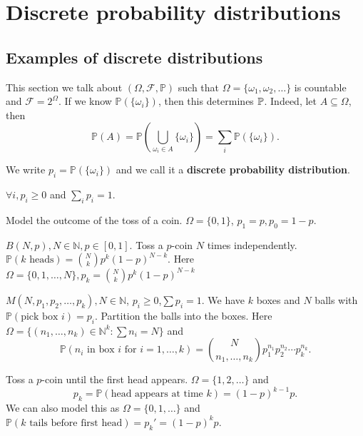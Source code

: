\section{Discrete probability distributions}
\subsection{Examples of discrete distributions}
This section we talk about $ (\Omega,\mathscr{F},\mathbb{P}) $ such that $ \Omega=\{\omega_1,\omega_2,\dots\} $ is countable and $ \mathscr{F} = 2^{\Omega} $. If we know $ \mathbb{P}(\{\omega_i\}) $, then this determines ${\mathbb{P}}$. Indeed, let $ A \subseteq \Omega $, then
\[
    \mathbb{P}(A) = \mathbb{P}\left( \bigcup_{\omega_i\in A}\{\omega_i\} \right) = \sum_{i} \mathbb{P}(\{\omega_i\}).
\]
\begin{definition}
    We write $ p_i = \mathbb{P}(\{\omega_i\}) $ and we call it a \textbf{discrete probability distribution}.
\end{definition}
\begin{proposition}
    $ \forall i,p_i\ge 0 $ and $ \sum_i p_i=1 $.
\end{proposition}

\begin{example}
    Model the outcome of the toss of a coin. $ \Omega = \{0,1\} $, $ p_1=p,p_0=1-p $.
\end{example}

\begin{example}
    $ B(N,p),N\in \mathbb{N}, p\in [0,1] $. Toss a $p$-coin $N$ times independently. $ \mathbb{P}(k\text{ heads}) = \binom{N}{k}p^k(1-p)^{N-k} $. Here $ \Omega=\{0,1,\dots,N\},p_k=\binom{N}{k}p^k(1-p)^{N-k} $
\end{example}

\begin{example}
    $ M(N,p_1,p_2,\dots,p_k), N\in \mathbb{N}$, $p_i\ge 0$,$\sum p_i=1 $. We have $k$ boxes and $N$ balls with $ \mathbb{P}(\text{pick box }i)=p_i $. Partition the balls into the boxes. Here $ \Omega = \{(n_1,\dots,n_k)\in \mathbb{N}^k: \sum n_i=N\} $ and 
    \[
        \mathbb{P}(n_i \text{ in box }i \text{ for } i=1,\dots,k) = \binom{N}{n_1,\dots,n_k}p_1^{n_1}p_2^{n_2}\cdots p_k^{n_k}.
    \]
\end{example}

\begin{example}
    Toss a $p$-coin until the first head appears. $ \Omega=\{1,2,\dots\} $ and
    \[
        p_k=\mathbb{P}(\text{head appears at time }k)=(1-p)^{k-1}p.
    \]
    We can also model this as $ \Omega=\{0,1,\dots\} $ and $ \mathbb{P}(k \text{ tails before first head})=p_k'=(1-p)^{k}p $.
\end{example}

